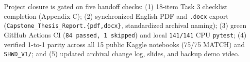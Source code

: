 Project closure is gated on five handoff checks: (1) 18-item Task 3 checklist completion (Appendix C); (2) synchronized English PDF and \texttt{.docx} export (\nolinkurl{Capstone_Thesis_Report.{pdf,docx}}, standardized archival naming); (3) green GitHub Actions CI (\texttt{84 passed, 1 skipped}) and local \texttt{141/141} CPU \texttt{pytest}; (4) verified 1-to-1 parity across all 15 public Kaggle notebooks (75/75 MATCH) and \texttt{SHWD\_V1/}; and (5) updated archival change log, slides, and backup demo video.
